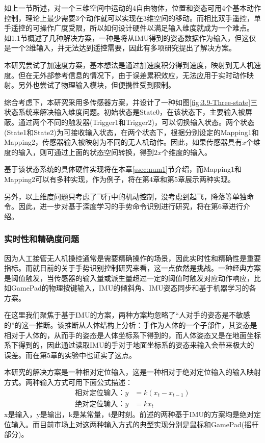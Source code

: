 如上一节所述，对一个三维空间中运动的4自由物体，位置和姿态可用4个基本动作控制，理论上最少需要3个动作就可以实现在3维空间的移动。而相比双手遥控，单手遥控的可操作广度受限，所以如何设计硬件以满足输入维度就成为一个难点。
如1.1节概述了几种解决方案，一种是将从IMU得到的姿态数据作为输入，但这仅是一个2维输入，并无法达到遥控需要，因此有多项研究提出了解决方案\cites{mughees2020gesture,budiyanto2021navigation,muezzinouglu2021intelligent,lee2023wearable,cherpillod2019embodied,kim2022intuitive}。

本研究尝试了加速度方案，基本想法是通过加速度积分得到速度，映射到无人机速度。但在无外部参考信息的情况下，由于误差累积效应，无法应用于实时动作映射。另外也尝试了物理输入模块，但便携性受到限制。

综合考虑下，本研究采用多传感器方案，并设计了一种如图\ref{fig:3.9-Three-state}三状态系统来解决输入维度问题。初始状态是State0，在该状态下，主要输入被屏蔽。通过两个不同的触发器(Trigger1和Trigger2)，可以切换输入状态。两个状态(State1和State2)为可接收输入状态，在两个状态下，根据分别设定的Mapping1和Mapping2，传感器输入被映射为不同的无人机动作。因此，如果传感器具有$x$个维度的输入，则可通过上面的状态空间转换，得到$2x$个维度的输入。

基于该状态系统的具体硬件实现将在本章\ref{ssec:num1}节介绍，而Mapping1和Mapping2可以有多种实现，作为例子，将在第4章和第5章展示两种实现。

另外，以上维度问题只考虑了飞行中的机动控制，没考虑到起飞，降落等单独命令。因此，进一步对基于深度学习的手势命令识别进行研究，将在第6章进行介绍。

\subsubsection{实时性和精确度问题}

因为人工接管无人机操控通常是需要精确操作的场景，因此实时性和精确性是重要指标。而就日前的关于手势识别控制研究来看，这一点依然是挑战。一种经典方案是阈值触发，当传感器的输入量或派生量超过一定的阈值时触发对应动作响应，比如GamePad的物理按键输入，IMU的倾斜角\cites{covaciu2022control}、IMU姿态同步\cites{kim2022intuitive}和基于机器学习的各方案。

在这里我们聚焦于基于IMU的方案，两种方案均忽略了“人对手的姿态是不敏感的”的这一推断。该推断从人体结构上分析：手作为人体的一个子部件，其姿态是相对于人体的，从而手的姿态是人体坐标系下得到的，而人体姿态又是在地面坐标系下得到的，因此通过读取IMU的手对于地面坐标系的姿态来输入会带来极大的误差。而在第5章的实验中也证实了这点。

本研究的解决方案是一种相对定位输入，这是一种相对于绝对定位输入的输入映射方式。两种输入方式可用下面公式描述：
\begin{align}
    \text{相对定位输入：}y &= k(x_t-x_{t-1})\\
    \text{绝对定位输入：}y &= kx_t
\end{align}
x是输入，y是输出，k是某常量，t是时刻。前述的两种基于IMU的方案均是绝对定位输入。而目前市场上对这两种输入方式的典型实现分别是鼠标和GamePad(摇杆部分)。

